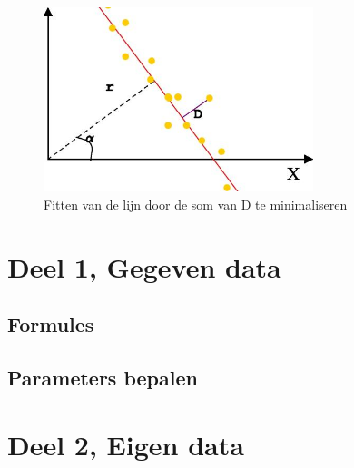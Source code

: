 \documentclass[a4paper]{article}
\begin{document}
\begin{figure}[h]
	\centering
	\includegraphics[width=0.7\textwidth]{img/stolenline.png}
	\caption{Fitten van de lijn door de som van D te minimaliseren}
	\label{fig:linefit}
\end{figure}


\section{Deel 1, Gegeven data}
\subsection{Formules}
\subsection{Parameters bepalen}
\section{Deel 2, Eigen data}
\end{document}
